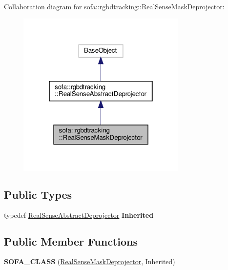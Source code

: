 Collaboration diagram for sofa\+:\+:rgbdtracking\+:\+:Real\+Sense\+Mask\+Deprojector\+:\nopagebreak
\begin{figure}[H]
\begin{center}
\leavevmode
\includegraphics[width=238pt]{classsofa_1_1rgbdtracking_1_1_real_sense_mask_deprojector__coll__graph}
\end{center}
\end{figure}
\subsection*{Public Types}
\begin{DoxyCompactItemize}
\item 
\mbox{\label{classsofa_1_1rgbdtracking_1_1_real_sense_mask_deprojector_aa8f05cf5049f6cef0ea54ba40efa0727}} 
typedef \hyperlink{classsofa_1_1rgbdtracking_1_1_real_sense_abstract_deprojector}{Real\+Sense\+Abstract\+Deprojector} {\bfseries Inherited}
\end{DoxyCompactItemize}
\subsection*{Public Member Functions}
\begin{DoxyCompactItemize}
\item 
\mbox{\label{classsofa_1_1rgbdtracking_1_1_real_sense_mask_deprojector_a7661938009502eb3591b1cf196b3489d}} 
{\bfseries S\+O\+F\+A\+\_\+\+C\+L\+A\+SS} (\hyperlink{classsofa_1_1rgbdtracking_1_1_real_sense_mask_deprojector}{Real\+Sense\+Mask\+Deprojector}, Inherited)
\end{DoxyCompactItemize}
